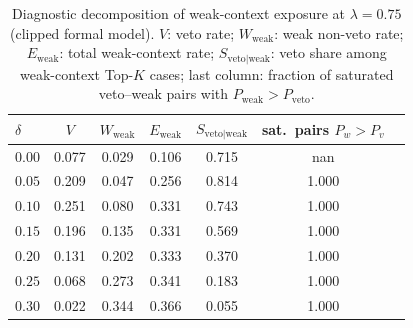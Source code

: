 \begin{table}[H]
\caption{Diagnostic decomposition of weak-context exposure at $\lambda=0.75$ (clipped formal model). $V$: veto rate; $W_{\mathrm{weak}}$: weak non-veto rate; $E_{\mathrm{weak}}$: total weak-context rate; $S_{\mathrm{veto|weak}}$: veto share among weak-context Top-$K$ cases; last column: fraction of saturated veto--weak pairs with $P_{\mathrm{weak}}>P_{\mathrm{veto}}$.}
\label{tab:deep-exposure-decomposition}
\centering
\small
\renewcommand{\arraystretch}{1.2}
\begin{tabular}{lcccccc}
\toprule
$\delta$ & $V$ & $W_{\mathrm{weak}}$ & $E_{\mathrm{weak}}$ & $S_{\mathrm{veto|weak}}$ & sat.\ pairs $P_w>P_v$ \\
\midrule
$0.00$ & 0.077 & 0.029 & 0.106 & 0.715 & nan \\
$0.05$ & 0.209 & 0.047 & 0.256 & 0.814 & 1.000 \\
$0.10$ & 0.251 & 0.080 & 0.331 & 0.743 & 1.000 \\
$0.15$ & 0.196 & 0.135 & 0.331 & 0.569 & 1.000 \\
$0.20$ & 0.131 & 0.202 & 0.333 & 0.370 & 1.000 \\
$0.25$ & 0.068 & 0.273 & 0.341 & 0.183 & 1.000 \\
$0.30$ & 0.022 & 0.344 & 0.366 & 0.055 & 1.000 \\
\bottomrule
\end{tabular}
\end{table}
